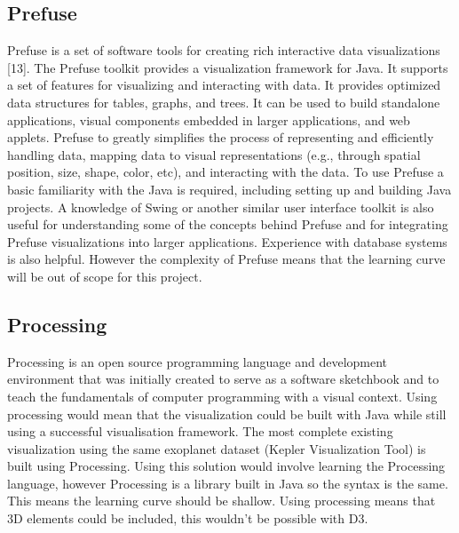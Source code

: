 \subsection{Prefuse}
Prefuse is a set of software tools for creating rich interactive data
visualizations [13]. The
Prefuse toolkit provides a visualization framework for Java. It supports a set
of features
for visualizing and interacting with data. It provides optimized data structures
for tables,
graphs, and trees. It can be used to build standalone applications, visual
components embedded
in larger applications, and web applets. Prefuse to greatly simplifies the
process
of representing and efficiently handling data, mapping data to visual
representations (e.g.,
through spatial position, size, shape, color, etc), and interacting with the
data.
To use Prefuse a basic familiarity with the Java is required, including setting
up and building
Java projects. A knowledge of Swing or another similar user interface toolkit is
also
useful for understanding some of the concepts behind Prefuse and for integrating
Prefuse
visualizations into larger applications. Experience with database systems is
also helpful. 
However the complexity of Prefuse means that the learning curve will be out of
scope for
this project.

\subsection{Processing}
Processing is an open source programming language and development environment
that was initially created to serve as a software
sketchbook and to teach the fundamentals of computer programming with a visual
context.
Using processing would mean that the visualization could be built with Java
while still using
a successful visualisation framework. The most complete existing visualization
using
the same exoplanet dataset (Kepler Visualization Tool) is built using
Processing.
Using this solution would involve learning the Processing language, however
Processing
is a library built in Java so the syntax is the same. This means the learning
curve should be shallow.
Using processing means that 3D elements could be included, this wouldn't be
possible with D3.


